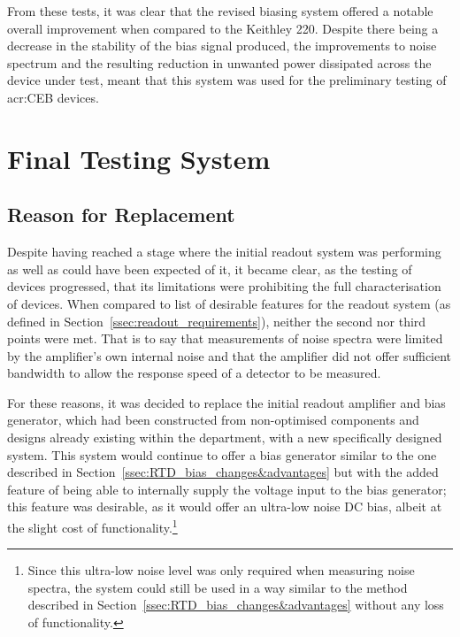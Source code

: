 \par 
From these tests, it was clear that the revised biasing system offered a notable overall improvement when compared to the Keithley 220. Despite there being a decrease in the stability of the bias signal produced, the improvements to noise spectrum and the resulting reduction in unwanted power dissipated across the device under test, meant that this system was used for the preliminary testing of \gls{acr:CEB} devices.

\section{Final Testing System} \label{sec:Final_Readout}
\subsection{Reason for Replacement}\label{ssec:Final_Readout_Reasons}
Despite having reached a stage where the initial readout system was performing as well as could have been expected of it, it became clear, as the testing of devices progressed, that its limitations were prohibiting the full characterisation of devices. When compared to list of desirable features for the readout system (as defined in Section~\ref{ssec:readout_requirements}), neither the second nor third points were met. That is to say that measurements of noise spectra were limited by the amplifier's own internal noise and that the amplifier did not offer sufficient bandwidth to allow the response speed of a detector to be measured.
\par 
For these reasons, it was decided to replace the initial readout amplifier and bias generator, which had been constructed from non-optimised components and designs already existing within the department, with a new specifically designed system. This system would continue to offer a bias generator similar to the one described in Section~\ref{ssec:RTD_bias_changes&advantages} but with the added feature of being able to internally supply the voltage input to the bias generator; this feature was desirable, as it would offer an ultra-low noise DC bias, albeit at the slight cost of functionality.\footnote{Since this ultra-low noise level was only required when measuring noise spectra, the system could still be used in a way similar to the method described in Section~\ref{ssec:RTD_bias_changes&advantages} without any loss of functionality.}

